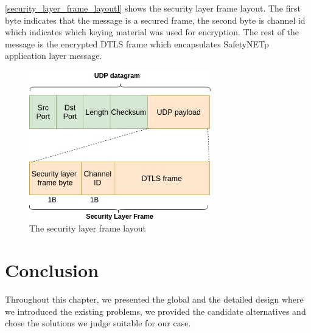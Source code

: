 \autoref{security_layer_frame_layoutl} shows the security layer frame layout. The first byte indicates that the message is a secured
frame, the second byte is channel id which indicates which keying material was used for encryption. The rest
of the message is the encrypted DTLS frame which encapsulates SafetyNETp application layer message.

\begin{figure}[H]
\centering
\includegraphics[height=6.5cm]{figures/design/Security_layer_frame_layout.jpg}
\caption{The security layer frame layout}\label{security_layer_frame_layoutl}
\end{figure}

\section*{Conclusion}

Throughout this chapter, we presented the global and the detailed design where we introduced
the existing problems, we provided the candidate alternatives and chose the solutions we judge suitable
for our case.
